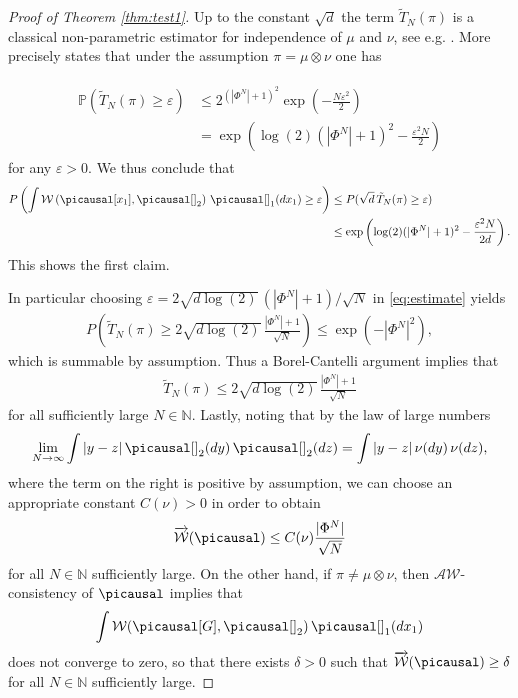 \documentclass[10pt]{amsart}
\newcommand{\N}{\mathbb{N}}
\renewcommand{\P}{\mathds{P}}
\renewcommand{\epsilon}{\varepsilon}
\begin{document}
\begin{appendix}
\begin{proof}[Proof of Theorem \ref{thm:test1}]
Up to the constant $\sqrt{d}$ the term $\tilde{T}_N(\pi)$ is a classical non-parametric estimator for independence of $\mu$ and $\nu$, see e.g. \cite{gretton2010consistent}.
More precisely \cite[Theorem 1]{gretton2010consistent} states that under the assumption $\pi=\mu\otimes \nu$ one has

\begin{align}\label{eq:estimate}
\begin{split}
\P( \tilde{T}_N(\pi) \ge \epsilon)&\le 2^{(|\Phi^N|+1)^2} \exp\left(-\frac{N \varepsilon^{2}}{ 2}\right)\\
&=\exp\left(  \log(2) (|\Phi^N|+1)^2-\frac{\varepsilon^{2}N}{ 2} \right)
\end{split}
\end{align}
for any $\epsilon>0$. We thus conclude that
\begin{align*}
\begin{split}
P\left(\int \mathcal{W}\left(\picausal[x_1],\picausal[]_2\right)\,\picausal[]_1(dx_1) \ge \epsilon \right)&\le 
P( \sqrt{d}\, \tilde{T}_N(\pi) \ge \epsilon)\\
&\le \exp\left(  \log(2) (|\Phi^N|+1)^2-\frac{\varepsilon^{2}N}{2d}\right).
\end{split}
\end{align*}
This shows the first claim.


In particular choosing $\epsilon= 2\sqrt{d\log(2)}\,(|\Phi^N|+1)/\sqrt{N}$ in \eqref{eq:estimate} yields
\begin{align*}
P\left( \tilde{T}_N(\pi) \ge 2\sqrt{d\log(2)}\, \frac{|\Phi^N|+1}{\sqrt{N}}\right)\le  \exp(-|\Phi^N|^2), 
\end{align*}
which is summable by assumption. Thus a Borel-Cantelli argument implies that
\begin{align*}
\tilde{T}_N(\pi) \le 2\sqrt{d\log(2)}\, \frac{|\Phi^N|+1}{\sqrt{N}}
\end{align*}
for all sufficiently large $N\in \N$. Lastly, noting that by the law of large numbers
\begin{align*}
\lim_{N\to\infty} \int |y-z|\,\picausal[]_2(dy)\,\picausal[]_2(dz)= \int |y-z|\,\nu(dy)\,\nu(dz),
\end{align*}
where the term on the right is positive by assumption, we can choose an appropriate constant $C(\nu)>0$ in order to obtain
\begin{align*}
\overrightarrow{\mathcal{W}}(\picausal) \le C(\nu)\frac{|\Phi^N|}{\sqrt{N}}
\end{align*}
for all $N\in \N$ sufficiently large. On the other hand, if $\pi\neq \mu\otimes\nu$, then $\mathcal{AW}$-consistency of $\picausal$ implies that $$\int \mathcal{W}( \picausal[G], \picausal[]_2) \,\picausal[]_1(dx_1)$$ does not converge to zero, so that there exists $\delta>0$ such that $\overrightarrow{\mathcal{W}}(\picausal)\ge \delta$ for all $N\in \N$ sufficiently large.
\end{proof}


\end{appendix}
\end{document}
